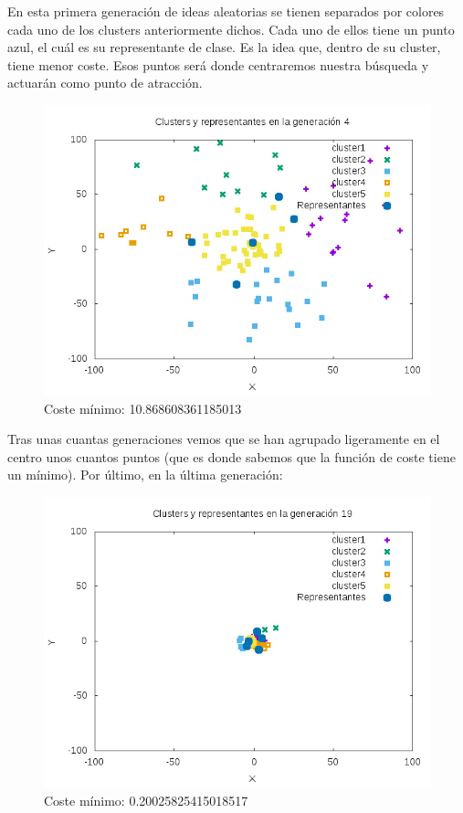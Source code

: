 En esta primera generación de ideas aleatorias se tienen separados por colores cada uno de los clusters anteriormente dichos. Cada uno de ellos tiene un punto azul, el cuál es su representante de clase. Es la idea que, dentro de su cluster, tiene menor coste. Esos puntos será donde centraremos nuestra búsqueda y actuarán como punto de atracción.\\

\begin{figure}[H]
\centering
\includegraphics[width=0.7\linewidth]{graficos/4out}
\caption{Coste mínimo: 10.868608361185013}
\label{fig:1out}
\end{figure}

Tras unas cuantas generaciones vemos que se han agrupado ligeramente en el centro unos cuantos puntos (que es donde sabemos que la función de coste tiene un mínimo). Por último, en la última generación:\\

\begin{figure}[H]
\centering
\includegraphics[width=0.7\linewidth]{graficos/19out}
\caption{Coste mínimo: 0.20025825415018517}
\label{fig:19out}
\end{figure}

